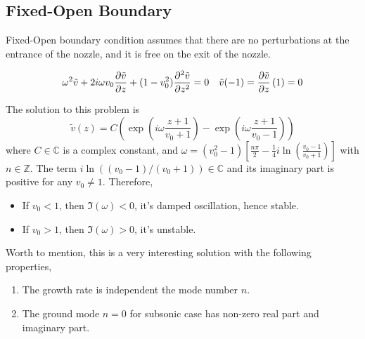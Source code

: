 \subsection{Fixed-Open Boundary}
Fixed-Open boundary condition assumes that there are no perturbations at the entrance of the nozzle, and it is free on the exit of the nozzle.

\begin{equation} \label{eq:constant-v-problem-fixed-open}
	\omega^2\tilde{v} + 2i\omega v_0\pdv{\tilde{v}}{z} + (1-v_0^2)\pdv[2]{\tilde{v}}{z} = 0
	\quad
	\tilde{v}(-1) = \pdv{\tilde{v}}{z}\,(1) = 0
\end{equation}

The solution to this problem is
\begin{equation} \label{eq:constant-v-solution-fixed-open}
	\tilde{v}(z) = C\left(\exp\left(i\omega\frac{z+1}{v_0+1}\right)
	- \exp\left(i\omega\frac{z+1}{v_0-1}\right)\right)
\end{equation}
where $C\in\mathbb{C}$ is a complex constant, and $\omega = (v_0^2 - 1) \left[\frac{n\pi}{2} - \frac{1}{4}i\ln(\frac{v_0-1}{v_0+1})\right]$ with $n\in\mathbb{Z}$. The term $i\ln((v_0-1)/(v_0+1))\in\mathbb{C}$ and its imaginary part is positive for any $v_0\neq 1$. Therefore,
\begin{itemize}
	\item If $v_0<1$, then $\Im(\omega)<0$, it's damped oscillation, hence stable.
	\item If $v_0>1$, then $\Im(\omega)>0$, it's unstable.
\end{itemize}

Worth to mention, this is a very interesting solution with the following properties,
\begin{enumerate}
	\item The growth rate is independent the mode number $n$.
	\item The ground mode $n=0$ for subsonic case has non-zero real part and imaginary part.
\end{enumerate}

